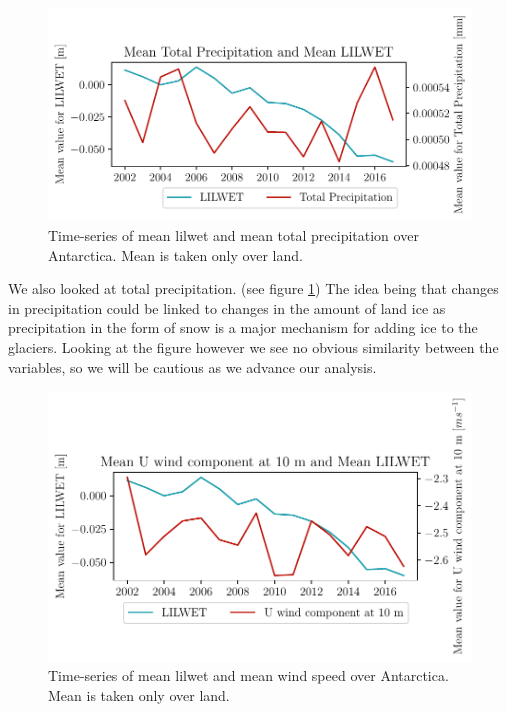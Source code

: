 \documentclass[../main.tex]{subfiles}
\begin{document}
\begin{figure}[hbt!]
    \centering
    \includegraphics{images/2021w5/chapter7/hres/tiemseries_tp_LIC}
    \caption{Time-series of mean \gls{lilwet} and mean total precipitation over Antarctica. Mean is taken only over land.}
    \label{fig:timeseries_tp}
\end{figure}

We also looked at total precipitation. (see figure \ref{fig:timeseries_tp}) The idea being that changes in precipitation could be linked to changes in the amount of land ice as precipitation in the form of snow is a major mechanism for adding ice to the glaciers. Looking at the figure however we see no obvious similarity between the variables, so we will be cautious as we advance our analysis.

\begin{figure}[hbt!]
    \centering
    \includegraphics{images/2021w5/chapter7/hres/tiemseries_u_10_LIC}
    \caption{Time-series of mean \gls{lilwet} and mean wind speed over Antarctica. Mean is taken only over land.}
    \label{fig:timeseries_u_10}
\end{figure}
\end{document}
